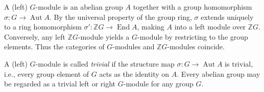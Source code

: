 A (left) $G$-module is an abelian group $A$ together with a group homomorphism $\sigma: G \to \operatorname{Aut} A$. By the universal property of the group ring, $\sigma$ extends uniquely to a ring homomorphism $\sigma': \mathbb{Z}G \to \operatorname{End} A$, making $A$ into a left module over $\mathbb{Z}G$. Conversely, any left $\mathbb{Z}G$-module yields a $G$-module by restricting to the group elements. Thus the categories of $G$-modules and $\mathbb{Z}G$-modules coincide.

A (left) $G$-module is called \emph{trivial} if the structure map $\sigma: G \to \operatorname{Aut} A$ is trivial, i.e., every group element of $G$ acts as the identity on $A$. Every abelian group may be regarded as a trivial left or right $G$-module for any group $G$.
